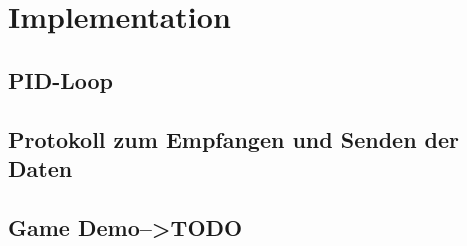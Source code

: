 \section{Implementation}

\subsection{PID-Loop}

\newpage

\subsection{Protokoll zum Empfangen und Senden der Daten}

\newpage

\subsection{Game Demo-->TODO} 

\newpage

